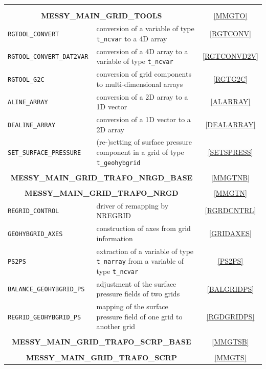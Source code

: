 \documentclass[11pt,twoside]{article}
\begin{document}
\begin{longtable}{|p{5cm}p{8.5cm}c|}
 & & \\ 
 & & \\ 
\multicolumn{2}{|c}{\bf \large MESSY\_MAIN\_GRID\_TOOLS}& \ref{MMGTO}\\ \hline 
\color{blue} \tt {RGTOOL\_CONVERT} & conversion of a variable of
 type \verb|t_ncvar| to a 4D array & \ref{RGTCONV}\\ 
\color{blue} \tt {RGTOOL\_CONVERT\_DAT2VAR} & conversion of a 4D array
to a variable of type \verb|t_ncvar| & \ref{RGTCONVD2V}\\ 
\color{blue} \tt {RGTOOL\_G2C} & conversion of grid components to
multi-dimensional arrays & \ref{RGTG2C}\\ 
\color{blue} \tt {ALINE\_ARRAY} & conversion of a 2D array to a 1D vector & \ref{ALARRAY}\\ 
\color{blue} \tt {DEALINE\_ARRAY} & conversion of a 1D vector to a 2D array & \ref{DEALARRAY}\\ 
\color{blue} \tt {SET\_SURFACE\_PRESSURE} & (re-)setting of surface
pressure component in a grid of type \verb|t_geohybgrid|  & \ref{SETSPRESS}\\ 
 & & \\ 
\multicolumn{2}{|c}{\bf \large MESSY\_MAIN\_GRID\_TRAFO\_NRGD\_BASE}& \ref{MMGTNB}\\ \hline 
 & & \\ 
\multicolumn{2}{|c}{\bf \large MESSY\_MAIN\_GRID\_TRAFO\_NRGD}& \ref{MMGTN}\\ \hline 
\color{blue} \tt {REGRID\_CONTROL} & driver of remapping by NREGRID & \ref{RGRDCNTRL}\\ 
\color{blue} \tt {GEOHYBGRID\_AXES} & construction of axes from grid information& \ref{GRIDAXES}\\ 
\color{blue} \tt {PS2PS} & extraction of a variable of
type \verb|t_narray| from a variable of type \verb|t_ncvar| & \ref{PS2PS}\\ 
\color{blue} \tt {BALANCE\_GEOHYBGRID\_PS} & adjustment of the surface
pressure fields of two grids & \ref{BALGRIDPS}\\ 
\color{blue} \tt {REGRID\_GEOHYBGRID\_PS} & mapping of the surface
pressure field of one grid to another grid & \ref{RGDGRIDPS}\\ 
 & & \\ 
\multicolumn{2}{|c}{\bf \large MESSY\_MAIN\_GRID\_TRAFO\_SCRP\_BASE}& \ref{MMGTSB}\\ \hline 
 & & \\ 
\multicolumn{2}{|c}{\bf \large MESSY\_MAIN\_GRID\_TRAFO\_SCRP}& \ref{MMGTS}\\ \hline 

\end{longtable}
\end{document}
